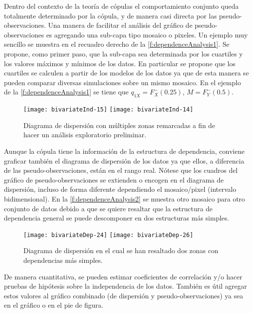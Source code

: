 Dentro del contexto de la teor\'ia de c\'opulas el comportamiento conjunto queda totalmente determinado por la c\'opula, y de manera casi directa por las pseudo-observaciones. Una manera de facilitar el an\'alisis del gr\'afico de pseudo-observaciones es agregando una sub-capa tipo mosaico o pixeles. Un ejemplo muy sencillo se muestra en el recuadro derecho de la \autoref{f:dependenceAnalysis1}. Se propone, como primer paso, que la sub-capa sea determinada por los cuartiles y los valores m\'aximos y m\'inimos de los datos. En particular se propone que los cuartiles se calculen a partir de los modelos de los datos ya que de esta manera se pueden comparar diversas simulaciones sobre un mismo mosaico. En el ejemplo de la \autoref{f:dependenceAnalysis1} se tiene que $q_{1X} = F_X^-(0.25)$, $M=F_Y^-(0.5)$.

\begin{figure}[H]
	\centering
	\texttt{[image: bivariateInd-15]}
	\qquad
	\texttt{[image: bivariateInd-14]}
	\caption{Diagrama de dispersi\'on con m\'ultiples zonas remarcadas a fin de hacer un an\'alisis exploratorio preliminar.}
	\label{f:dependenceAnalysis2}
\end{figure}

Aunque la c\'opula tiene la informaci\'on de la estructura de dependencia, conviene graficar tambi\'en el diagrama de dispersi\'on de los datos ya que ellos, a diferencia de las pseudo-observaciones, est\'an en el rango real. N\'otese que los cuadros del gr\'afico de pseudo-observaciones se extienden o encogen en el diagrama de dispersi\'on, incluso de forma diferente dependiendo el mosaico/pixel (intervalo bidimensional). En la \autoref{f:dependenceAnalysis2} se muestra otro mosaico para otro conjunto de datos debido a que se quiere resaltar que la estructura de dependencia general se puede descomponer en dos estructuras m\'as simples.

\begin{figure}[H]
	\centering
	\texttt{[image: bivariateDep-24]}
	\qquad
	\texttt{[image: bivariateDep-26]}
	\caption{Diagrama de dispersi\'on en el cual se han resaltado dos zonas con dependencias m\'as simples.}
	\label{f:dependenceAnalysis1}
\end{figure}

De manera cuantitativa, se pueden estimar coeficientes de correlaci\'on y/o hacer pruebas de hip\'otesis sobre la independencia de los datos. Tambi\'en es \'util agregar estos valores al gr\'afico combinado (de dispersi\'on y pseudo-observaciones) ya sea en el gr\'afico o en el pie de figura.

